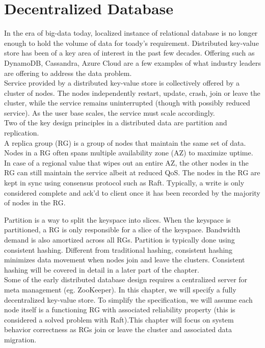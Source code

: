 % 

\usetikzlibrary{arrows.meta} %

\chapter{Decentralized Database}

In the era of big-data today, localized instance of relational database is no
longer enough to hold the volume of data for toady's requirement. Distributed
key-value store has been of a key area of interest in the past few decades. 
Offering such as DynamoDB, Cassandra, Azure Cloud are a few examples of what
industry leaders are offering to address the data problem.\\

Service provided by a distributed key-value store is collectively offered by a
cluster of nodes. The nodes independently restart, update, crash, join or leave 
the cluster, while the service remains uninterrupted (though with possibly
reduced service). As the user base scales, the service must scale accordingly.\\

Two of the key design principles in a distributed data are partition and
replication.\\

A replica group (RG) is a group of nodes that maintain the same set of data.
Nodes in a RG often spans multiple availability zone (AZ) to maximize uptime.
In case of a regional value that wipes out an entire AZ, the other nodes in the
RG can still maintain the service albeit at reduced QoS. The nodes in the RG are
kept in sync using consensus protocol such as Raft. Typically, a write is only
considered complete and ack'd to client once it has been recorded by the
majority of nodes in the RG.

Partition is a way to split the keyspace into slices. When the keyspace is
partitioned, a RG is only responsible for a slice of the keyspace. Bandwidth
demand is also amortized across all RGs. Partition is typically done using 
consistent hashing. Different from traditional hashing, consistent hashing
minimizes data movement when nodes join and leave the clusters. Consistent
hashing will be covered in detail in a later part of the chapter.\\

Some of the early distributed database design requires a centralized server for
meta management (eg. ZooKeeper). In this chapter, we will specify a fully
decentralized key-value store. To simplify the specification, we will assume 
each node itself is a functioning RG with associated reliability property (this
is considered a solved problem with Raft).This chapter will focus on system
behavior correctness as RGs join or leave the cluster and associated data
migration.

